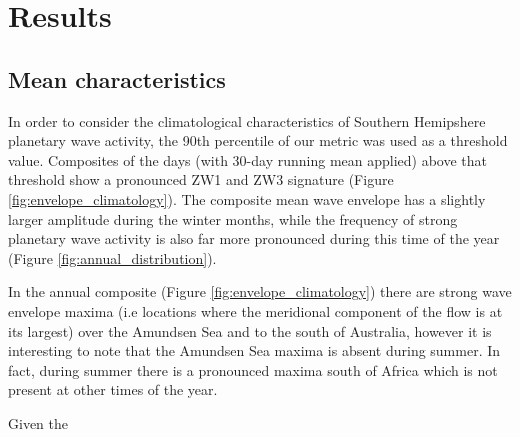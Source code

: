 \section{Results}

\subsection{Mean characteristics}

In order to consider the climatological characteristics of Southern Hemipshere planetary wave activity, the 90th percentile of our metric was used as a threshold value. Composites of the days (with 30-day running mean applied) above that threshold show a pronounced ZW1 and ZW3 signature (Figure \ref{fig:envelope_climatology}). The composite mean wave envelope has a slightly larger amplitude during the winter months, while the frequency of strong planetary wave activity is also far more pronounced during this time of the year (Figure \ref{fig:annual_distribution}).

In the annual composite (Figure \ref{fig:envelope_climatology}) there are strong wave envelope maxima (i.e locations where the meridional component of the flow is at its largest) over the Amundsen Sea and to the south of Australia, however it is interesting to note that the Amundsen Sea maxima is absent during summer. In fact, during summer there is a pronounced maxima south of Africa which is not present at other times of the year.

Given the 



